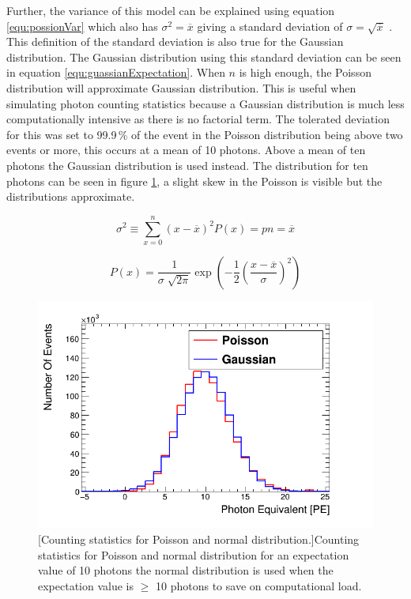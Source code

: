 Further, the variance of this model can be explained using equation  \ref{equ:possionVar} which also has $\sigma^2 = \overline{x}$ giving a standard deviation of $\sigma = \sqrt{\overline{x}}$ \cite{knoll_2010}. This definition of the standard deviation is also true for the Gaussian distribution. The Gaussian distribution using this standard deviation can be seen in equation \ref{equ:guassianExpectation}. When $n$ is high enough, the Poisson distribution will approximate Gaussian distribution. This is useful when simulating photon counting statistics because a Gaussian distribution is much less computationally intensive as there is no factorial term. The tolerated deviation for this was set to 99.9\,\% of the event in the Poisson distribution being above two events or more, this occurs at a mean of 10 photons. Above a mean of ten photons the Gaussian distribution is used instead. The distribution for ten photons can be seen in figure \ref{fig:CoutingStats10}, a slight skew in the Poisson is visible but the distributions approximate.

\begin{equation}
\sigma ^2 \equiv \sum_{x=0}^{n} (x-\overline{x})^2 P(x) = pn = \overline{x} 
\label{equ:possionVar}
\end{equation}

\begin{equation}
P(x) = \frac{1}{\sigma \sqrt[]{2 \pi}} \exp \left(-\frac{1}{2}\left(\frac{x-\overline{x}}{\sigma}\right)^{2}\right)
\label{equ:guassianExpectation}
\end{equation}

\begin{figure}[!h]
 \centering
 \includegraphics[width=0.7\linewidth]{Chapter4/Figs/poissionGaussian10Graph.png}
 [Counting statistics for Poisson and normal distribution.]{Counting statistics for Poisson and normal distribution for an expectation value of 10 photons the normal distribution is used when the expectation value is $\geq$ 10 photons to save on computational load.} 
 \label{fig:CoutingStats10}
\end{figure}

